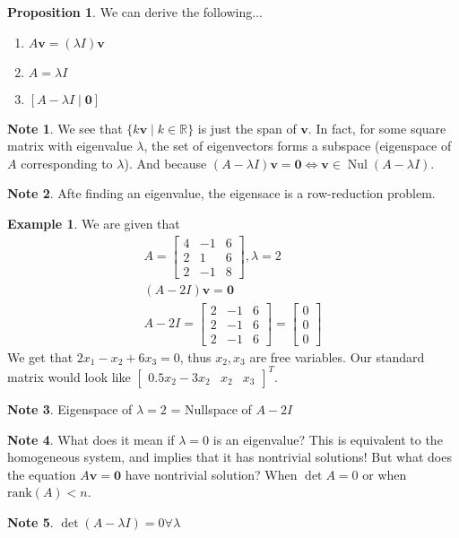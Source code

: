 \documentclass{article}
\numberwithin{equation}{section}
\theoremstyle{definition}
\newtheorem{ex}[thm]{Example}
\newtheorem{proposition}[thm]{Proposition}
\newtheorem{note}{Note}[subsection]
\newcommand{\V}{\mathbf{v}}
\newcommand{\R}{\mathbb{R}}
\DeclareMathOperator{\nul}{Nul}
\let\oldforall\forall
\renewcommand{\forall}{\mathrel{\oldforall}}
\theoremstyle{adefn}
\begin{document}
	\begin{proposition}
		We can derive the following... 
		\begin{enumerate}
			\itemsep0em
			\item $A\V = (\lambda I)\V$
			\item $A = \lambda I$
			\item $[A - \lambda I \mid \textbf{0}]$
		\end{enumerate}
	\end{proposition}
	\begin{note}
		We see that $\{k\V \mid k \in \R\}$ is just the span of $\V$. In fact, for some square matrix with eigenvalue $\lambda$, the set of eigenvectors forms a subspace (eigenspace of $A$ corresponding to $\lambda$). And because $(A-\lambda I)\V = \textbf{0} \iff \V \in \nul(A-\lambda I)$. 
	\end{note}
	\begin{note}
		Afte finding an eigenvalue, the eigensace is a row-reduction problem. 
	\end{note}
	\begin{ex}
		We are given that \begin{align*}
			A = \begin{bmatrix}
				4 & -1 & 6 \\ 
				2 & 1 & 6 \\
				2 & -1 & 8
			\end{bmatrix}, \lambda = 2 \\ 
			(A - 2I)\V = \textbf{0} \\ 
			A-2I = \begin{bmatrix}
				2 & -1 & 6 \\
				2 & -1 & 6 \\ 
				2 & -1 & 6 
			\end{bmatrix} = \begin{bmatrix}
				0 \\ 0 \\ 0
			\end{bmatrix}
		\end{align*}
		We get that $2x_1 - x_2 + 6x_3 = 0$, thus $x_2, x_3$ are free variables. Our standard matrix would look like $\begin{bmatrix}
			0.5x_2 - 3x_2 & x_2 & x_3
		\end{bmatrix}^T$. 
	\end{ex}
	\begin{note}
		Eigenspace of $\lambda = 2$ = Nullspace of $A-2I$
	\end{note}
	\begin{note}
		What does it mean if $\lambda = 0$ is an eigenvalue? This is equivalent to the homogeneous system, and implies that it has nontrivial solutions! But what does the equation $A\V = \textbf{0}$ have nontrivial solution? When $\det A = 0$ or when $\text{rank}(A) < n$. 
	\end{note}
	\begin{note}
		$\det(A - \lambda I) = 0 \forall \lambda$
	\end{note}
	
\end{document}
